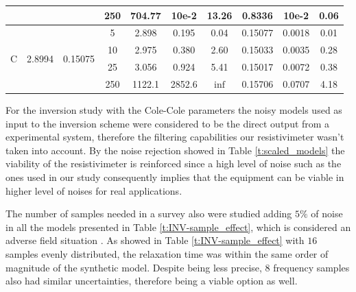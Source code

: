 \documentclass{vie16}
\begin{document}
\begin{table}[H]
\begin{adjustbox}{scale=0.8}
\begin{tabular}{|c|cc|c|ccc|ccc|}
 &  &  & 250 & 704.77  & 10e-2  &  13.26  & 0.8336 & 10e-2  & 0.06 \\ \hline
\multirow{4}{*}{C} & \multirow{4}{*}{2.8994} & \multirow{4}{*}{0.15075} 
				& 5 & 2.898 & 0.195 & 0.04    & 0.15077 & 0.0018 &
				0.01  \\
 &  &  & 10 & 2.975 & 0.380 & 2.60 & 0.15033 & 0.0035 & 0.28 \\
 &  &  & 25 & 3.056 & 0.924 & 5.41   & 0.15017 & 0.0072  &
 0.38 \\
 &  &  & 250 & 1122.1 &  2852.6 & $\inf$  & 0.15706 & 0.0707
 & 4.18  \\ \hline
\end{tabular}
\end{adjustbox}
\end{table}

For the inversion study with the Cole-Cole parameters the
noisy models used as input to the inversion scheme were
considered to be the direct output from a experimental
system, therefore the filtering capabilities our
resistivimeter wasn't taken into account. By the noise
rejection showed in Table \ref{t:scaled_models} the
viability of the resistivimeter is reinforced since a high
level of noise such as the ones used in our study
consequently implies that the equipment can be viable in
higher level of noises for real applications.

The number of samples needed in a survey also were studied adding $5\%$
of noise in all the models presented in Table
\ref{t:INV-sample_effect}, which is considered an adverse field situation
\citet{sandor11}. As showed in Table \ref{t:INV-sample_effect} with
$16$ samples evenly distributed, the relaxation time was within the
same order of magnitude of the synthetic model. Despite being less
precise, $8$ frequency samples also had similar uncertainties, therefore
being a viable option as well.
\end{document}
